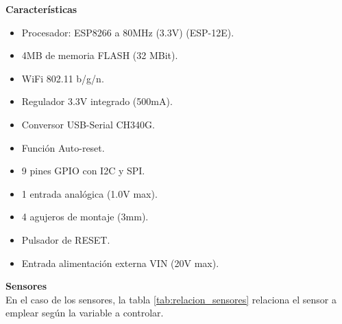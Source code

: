     \textbf{Características}
    \begin{itemize}
        \item Procesador: ESP8266 a 80MHz (3.3V) (ESP-12E).
        \item 4MB de memoria FLASH (32 MBit).
        \item WiFi 802.11 b/g/n.
        \item Regulador 3.3V integrado (500mA).
        \item Conversor USB-Serial CH340G.
        \item Función Auto-reset.
        \item 9 pines GPIO con I2C y SPI.
        \item 1 entrada analógica (1.0V max).
        \item 4 agujeros de montaje (3mm).
        \item Pulsador de RESET.
        \item Entrada alimentación externa VIN (20V max).
    \end{itemize}

    \textbf{Sensores}\\
    En el caso de los sensores, la tabla \ref{tab:relacion_sensores} relaciona el sensor a emplear según la variable a controlar.

